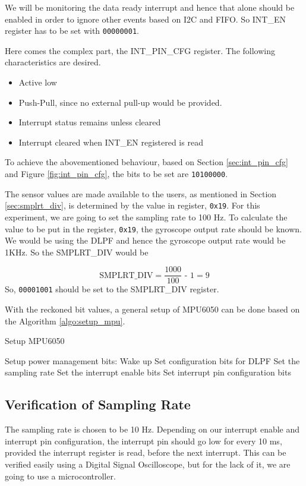\documentclass{article}
\begin{document}
	We will be monitoring the data ready interrupt and hence that alone should be enabled in order to ignore other events based on I2C and FIFO. So INT\_EN register has to be set with \texttt{00000001}. 
	
	Here comes the complex part, the INT\_PIN\_CFG register. The following characteristics are desired.
	
	\begin{itemize}
		\item Active low
		\item Push-Pull, since no external pull-up would be provided.
		\item Interrupt status remains unless cleared
		\item Interrupt cleared when INT\_EN registered is read
	\end{itemize}
	
	To achieve the abovementioned behaviour, based on Section \ref{sec:int_pin_cfg} and Figure \ref{fig:int_pin_cfg}, the bits to be set are \texttt{10100000}.
	
	The sensor values are made available to the users, as mentioned in Section \ref{sec:smplrt_div}, is determined by the value in register, \texttt{0x19}. For this experiment, we are going to set the sampling rate to 100 Hz. To calculate the value to be put in the register, \texttt{0x19}, the gyroscope output rate should be known. We would be using the DLPF and hence the gyroscope output rate would be 1KHz. So the SMPLRT\_DIV would be 
	
	$$ \text{SMPLRT\_DIV} = \frac{\text{1000}}{\text{100}} \text{ - 1} = 9$$
	So, \texttt{00001001} should be set to the SMPLRT\_DIV register.
	
	
	With the reckoned bit values, a general setup of MPU6050 can be done based on the Algorithm \ref{algo:setup_mpu}.

	
	\begin{algorithm}
		\label{algo:setup_mpu}
		\caption{Setup MPU6050}
		\begin{algorithmic}[1]
			\State Setup power management bits: Wake up
			\State Set configuration bits for DLPF 
			\State Set the sampling rate
			\State Set the interrupt enable bits
			\State Set interrupt pin configuration bits
		\end{algorithmic}
	\end{algorithm}

	\subsection{Verification of Sampling Rate}
	The sampling rate is chosen to be 10 Hz. Depending on our interrupt enable and interrupt pin configuration, the interrupt pin should go low for every 10 ms, provided the interrupt register is read, before the next interrupt. This can be verified easily using a Digital Signal Oscilloscope, but for the lack of it, we are going to use a microcontroller. 
	
\end{document}
